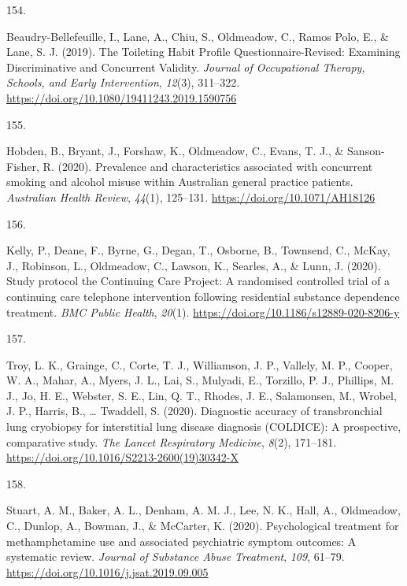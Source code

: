 \documentclass[11pt, a4paper]{awesome-cv}
\newlength{\csllabelwidth}
\newcommand{\CSLLeftMargin}[1]{\parbox[t]{\csllabelwidth}{#1}}
\newcommand{\CSLRightInline}[1]{\parbox[t]{\linewidth - \csllabelwidth}{#1}}
\begin{document}
\leavevmode\hypertarget{ref-beaudry-bellefeuille_toileting_2019}{}%
\CSLLeftMargin{154. }
\CSLRightInline{Beaudry-Bellefeuille, I., Lane, A., Chiu, S., Oldmeadow,
C., Ramos Polo, E., \& Lane, S. J. (2019). The Toileting Habit Profile
Questionnaire-Revised: Examining Discriminative and Concurrent Validity.
\emph{Journal of Occupational Therapy, Schools, and Early Intervention},
\emph{12}(3), 311--322.
\url{https://doi.org/10.1080/19411243.2019.1590756}}

\leavevmode\hypertarget{ref-hobden_prevalence_2020-1}{}%
\CSLLeftMargin{155. }
\CSLRightInline{Hobden, B., Bryant, J., Forshaw, K., Oldmeadow, C.,
Evans, T. J., \& Sanson-Fisher, R. (2020). Prevalence and
characteristics associated with concurrent smoking and alcohol misuse
within Australian general practice patients. \emph{Australian Health
Review}, \emph{44}(1), 125--131. \url{https://doi.org/10.1071/AH18126}}

\leavevmode\hypertarget{ref-kelly_study_2020}{}%
\CSLLeftMargin{156. }
\CSLRightInline{Kelly, P., Deane, F., Byrne, G., Degan, T., Osborne, B.,
Townsend, C., McKay, J., Robinson, L., Oldmeadow, C., Lawson, K.,
Searles, A., \& Lunn, J. (2020). Study protocol the Continuing Care
Project: A randomised controlled trial of a continuing care telephone
intervention following residential substance dependence treatment.
\emph{BMC Public Health}, \emph{20}(1).
\url{https://doi.org/10.1186/s12889-020-8206-y}}

\leavevmode\hypertarget{ref-troy_diagnostic_2020}{}%
\CSLLeftMargin{157. }
\CSLRightInline{Troy, L. K., Grainge, C., Corte, T. J., Williamson, J.
P., Vallely, M. P., Cooper, W. A., Mahar, A., Myers, J. L., Lai, S.,
Mulyadi, E., Torzillo, P. J., Phillips, M. J., Jo, H. E., Webster, S.
E., Lin, Q. T., Rhodes, J. E., Salamonsen, M., Wrobel, J. P., Harris,
B., \ldots{} Twaddell, S. (2020). Diagnostic accuracy of transbronchial
lung cryobiopsy for interstitial lung disease diagnosis (COLDICE): A
prospective, comparative study. \emph{The Lancet Respiratory Medicine},
\emph{8}(2), 171--181.
\url{https://doi.org/10.1016/S2213-2600(19)30342-X}}

\leavevmode\hypertarget{ref-stuart_psychological_2020}{}%
\CSLLeftMargin{158. }
\CSLRightInline{Stuart, A. M., Baker, A. L., Denham, A. M. J., Lee, N.
K., Hall, A., Oldmeadow, C., Dunlop, A., Bowman, J., \& McCarter, K.
(2020). Psychological treatment for methamphetamine use and associated
psychiatric symptom outcomes: A systematic review. \emph{Journal of
Substance Abuse Treatment}, \emph{109}, 61--79.
\url{https://doi.org/10.1016/j.jsat.2019.09.005}}
\end{document}
